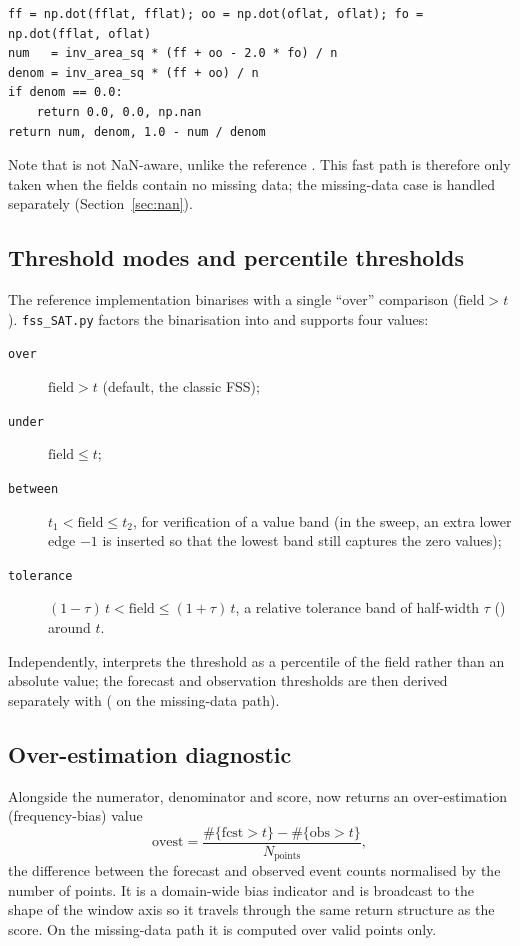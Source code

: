 {\begin{lstlisting}[style=python]
ff = np.dot(fflat, fflat); oo = np.dot(oflat, oflat); fo = np.dot(fflat, oflat)
num   = inv_area_sq * (ff + oo - 2.0 * fo) / n
denom = inv_area_sq * (ff + oo) / n
if denom == 0.0:
    return 0.0, 0.0, np.nan
return num, denom, 1.0 - num / denom
\end{lstlisting}}

Note that  is not NaN-aware, unlike the reference
. This fast path is therefore only taken when the fields
contain no missing data; the missing-data case is handled separately
(Section~\ref{sec:nan}).

\subsection{Threshold modes and percentile thresholds}
\label{sec:modes}

The reference implementation binarises with a single ``over'' comparison
($\text{field} > t$). \texttt{fss\_SAT.py} factors the binarisation into
 and supports four  values:
%
\begin{description}
  \item[\texttt{over}] $\text{field} > t$ (default, the classic FSS);
  \item[\texttt{under}] $\text{field} \le t$;
  \item[\texttt{between}] $t_1 < \text{field} \le t_2$, for verification of a
        value band (in the sweep, an extra lower edge $-1$ is inserted so that
        the lowest band still captures the zero values);
  \item[\texttt{tolerance}] $(1-\tau)\,t < \text{field} \le (1+\tau)\,t$,
        a relative tolerance band of half-width $\tau$ ()
        around $t$.
\end{description}
%
Independently,  interprets the threshold as a
percentile of the field rather than an absolute value; the forecast and
observation thresholds are then derived separately with 
( on the missing-data path).

\subsection{Over-estimation diagnostic}
\label{sec:ovest}

Alongside the numerator, denominator and score,  now
returns an over-estimation (frequency-bias) value
%
\begin{equation}
  \mathrm{ovest} = \frac{\#\{\text{fcst} > t\} - \#\{\text{obs} > t\}}
                        {N_\text{points}},
\end{equation}
%
the difference between the forecast and observed event counts normalised by the
number of points. It is a domain-wide bias indicator and is broadcast to the
shape of the window axis so it travels through the same return structure as the
score. On the missing-data path it is computed over valid points only.


